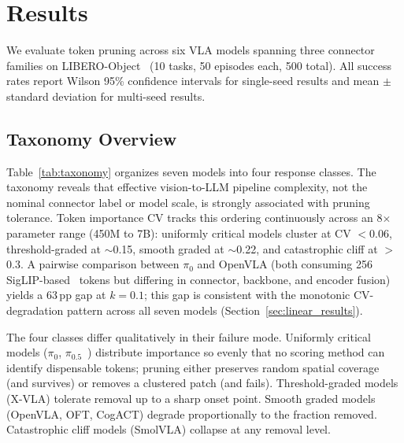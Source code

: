 \section{Results}
\label{sec:results}

We evaluate token pruning across six VLA models spanning three connector families on LIBERO-Object~\cite{liu2023libero} (10 tasks, 50 episodes each, 500 total). All success rates report Wilson 95\% confidence intervals for single-seed results and mean $\pm$ standard deviation for multi-seed results.

\subsection{Taxonomy Overview}
\label{sec:taxonomy_overview}

Table~\ref{tab:taxonomy} organizes seven models into four response classes. The taxonomy reveals that effective vision-to-LLM pipeline complexity, not the nominal connector label or model scale, is strongly associated with pruning tolerance. Token importance CV tracks this ordering continuously across an 8$\times$ parameter range (450M to 7B): uniformly critical models cluster at CV $< 0.06$, threshold-graded at $\sim$0.15, smooth graded at $\sim$0.22, and catastrophic cliff at $>$0.3. A pairwise comparison between $\pi_0$ and OpenVLA (both consuming 256 SigLIP-based~\cite{zhai2023siglip} tokens but differing in connector, backbone, and encoder fusion) yields a 63\,pp gap at $k{=}0.1$; this gap is consistent with the monotonic CV-degradation pattern across all seven models (Section~\ref{sec:linear_results}).

The four classes differ qualitatively in their failure mode. Uniformly critical models ($\pi_0$, $\pi_0.5$~\cite{black2025pi05}) distribute importance so evenly that no scoring method can identify dispensable tokens; pruning either preserves random spatial coverage (and survives) or removes a clustered patch (and fails). Threshold-graded models (X-VLA) tolerate removal up to a sharp onset point. Smooth graded models (OpenVLA, OFT, CogACT) degrade proportionally to the fraction removed. Catastrophic cliff models (SmolVLA) collapse at any removal level.

